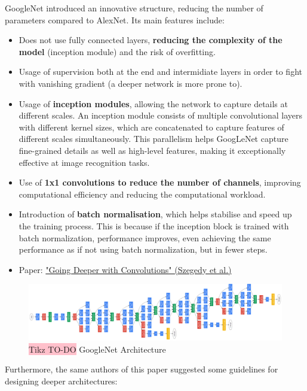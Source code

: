 GoogleNet introduced an innovative structure, reducing the number of parameters compared to AlexNet. Its main features include:
\begin{itemize}
    \item Does not use fully connected layers, \textbf{reducing the complexity of the model} (inception module) and the risk of overfitting.
    \item Usage of supervision both at the end and intermidiate layers in order to fight with vanishing gradient (a deeper network is more prone to). 
    \item Usage of \textbf{inception modules}, allowing the network to capture details at different scales. An inception module consists of multiple convolutional layers with different kernel sizes, which are concatenated to capture features of different scales simultaneously. This parallelism helps GoogLeNet capture fine-grained details as well as high-level features, making it exceptionally effective at image recognition tasks.
    \item Use of \textbf{1x1 convolutions to reduce the number of channels}, improving computational efficiency and reducing the computational workload.
    \item Introduction of \textbf{batch normalisation}, which helps stabilise and speed up the training process. This is because if the inception block is trained with batch normalization, performance improves, even achieving the same performance as if not using batch normalization, but in fewer steps.
    \item Paper: \href{https://arxiv.org/pdf/1409.4842.pdf}{"Going Deeper with Convolutions" (Szegedy et al.)}
\end{itemize}

\begin{figure}[!htbp]
    \centering
    \includegraphics[width=\textwidth]{tikz/chapter5 - GoogleNet.png}
    \caption{{\color{red}\colorbox{pink}{Tikz TO-DO}} GoogleNet Architecture}
\end{figure}


Furthermore, the same authors of this paper suggested some guidelines for designing deeper
architectures:


